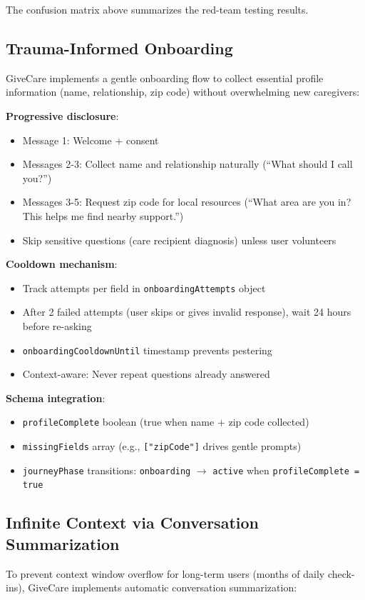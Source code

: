 \documentclass{article}
\begin{document}
The confusion matrix above summarizes the red-team testing results.

\subsection{Trauma{-}Informed Onboarding}%
\label{subsec:Trauma{-}InformedOnboarding}%
GiveCare implements a gentle onboarding flow to collect essential profile information (name, relationship, zip code) without overwhelming new caregivers:

\textbf{Progressive disclosure}:
\begin{itemize}
    \item Message 1: Welcome + consent
    \item Messages 2-3: Collect name and relationship naturally (``What should I call you?'')
    \item Messages 3-5: Request zip code for local resources (``What area are you in? This helps me find nearby support.'')
    \item Skip sensitive questions (care recipient diagnosis) unless user volunteers
\end{itemize}

\textbf{Cooldown mechanism}:
\begin{itemize}
    \item Track attempts per field in \texttt{onboardingAttempts} object
    \item After 2 failed attempts (user skips or gives invalid response), wait 24 hours before re-asking
    \item \texttt{onboardingCooldownUntil} timestamp prevents pestering
    \item Context-aware: Never repeat questions already answered
\end{itemize}

\textbf{Schema integration}:
\begin{itemize}
    \item \texttt{profileComplete} boolean (true when name + zip code collected)
    \item \texttt{missingFields} array (e.g., \texttt{["zipCode"]} drives gentle prompts)
    \item \texttt{journeyPhase} transitions: \texttt{onboarding} $\rightarrow$ \texttt{active} when \texttt{profileComplete = true}
\end{itemize}


%
\subsection{Infinite Context via Conversation Summarization}%
\label{subsec:InfiniteContextviaConversationSummarization}%
To prevent context window overflow for long-term users (months of daily check-ins), GiveCare implements automatic conversation summarization:
\end{document}
